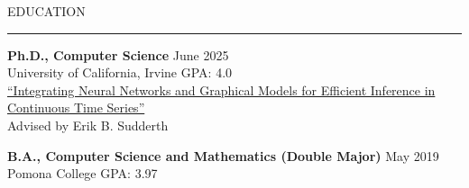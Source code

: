 \documentclass{resume} %
\renewenvironment{rSection}[1]{
\sectionskip
\textcolor{CarnegieMellonRed}{\MakeUppercase{#1}}
\sectionlineskip
\hrule
\begin{list}{}{
\setlength{\leftmargin}{1.5em}
}
\item[]
}{
\end{list}
}
\begin{document}
\vspace{2.em}
\begin{rSection}{Education}
{\bf Ph.D., Computer Science} \hfill {June 2025} 
\\ University of California, Irvine \hfill { GPA: 4.0}
\\ \href{https://escholarship.org/content/qt5xm7k78s/qt5xm7k78s.pdf}{``Integrating Neural Networks and Graphical Models for Efficient Inference in Continuous Time Series''}
\\ Advised by Erik B. Sudderth

{\bf B.A., Computer Science and Mathematics (Double Major)} \hfill { May 2019} 
\\ Pomona College \hfill { GPA: 3.97}\vspace{1.em}
\end{rSection}
\end{document}
